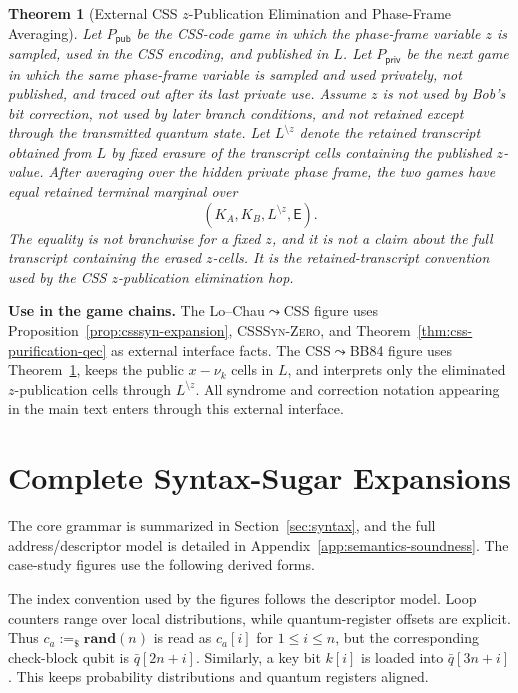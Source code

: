 \documentclass[conference,compsoc]{IEEEtran}
\newcommand{\bb}{\textsf{BB84}\xspace}
\newtheorem{theorem}{Theorem}
\begin{document}
\begin{theorem}[External CSS \(z\)-Publication Elimination and Phase-Frame Averaging]
\label{thm:phase-frame-averaging}
Let \(P_{\mathsf{pub}}\) be the CSS-code game in which the phase-frame variable
\(z\) is sampled, used in the CSS encoding, and published in \(L\). Let
\(P_{\mathsf{priv}}\) be the next game in which the same phase-frame variable is
sampled and used privately, not published, and traced out after its last private
use. Assume \(z\) is not used by Bob's bit correction, not used by later branch
conditions, and not retained except through the transmitted quantum state. Let
\(L^{\setminus z}\) denote the retained transcript obtained from \(L\) by fixed
erasure of the transcript cells containing the published \(z\)-value. After
averaging over the hidden private phase frame, the two games have equal retained
terminal marginal over
\[
(K_A,K_B,L^{\setminus z},\mathsf E).
\]
The equality is not branchwise for a fixed \(z\), and it is not a claim about
the full transcript containing the erased \(z\)-cells. It is the
retained-transcript convention used by the CSS \(z\)-publication elimination
hop.
\end{theorem}

\noindent\textbf{Use in the game chains.}
The Lo--Chau\(\leadsto\)CSS figure uses Proposition~\ref{prop:csssyn-expansion},
\textsc{CSSSyn-Zero}, and Theorem~\ref{thm:css-purification-qec} as external
interface facts. The
CSS\(\leadsto\)\bb figure uses Theorem~\ref{thm:phase-frame-averaging}, keeps
the public \(x-\nu_k\) cells in \(L\), and interprets only the eliminated
\(z\)-publication cells through \(L^{\setminus z}\). All syndrome and correction
notation appearing in the main text enters through this external interface.
\endgroup

\section{Complete Syntax-Sugar Expansions}
\label{app:syntax-sugar}
\begingroup
\setlength{\abovedisplayskip}{2pt}
\setlength{\belowdisplayskip}{2pt}
\setlength{\abovedisplayshortskip}{1pt}
\setlength{\belowdisplayshortskip}{1pt}
\setlength{\jot}{1pt}
\setlength{\arraycolsep}{2pt}
\allowdisplaybreaks

The core grammar is summarized in Section~\ref{sec:syntax}, and the full
address/descriptor model is detailed in Appendix~\ref{app:semantics-soundness}.
The case-study figures use the following derived forms.

The index convention used by the figures follows the descriptor model. Loop
counters range over local distributions, while quantum-register offsets are
explicit. Thus \(c_a:=_\$\mathbf{rand}(n)\) is read as \(c_a[i]\) for
\(1\le i\le n\), but the corresponding check-block qubit is
\(\bar q[2n+i]\). Similarly, a key bit \(k[i]\) is loaded into
\(\bar q[3n+i]\). This keeps probability distributions and quantum registers
aligned.
\end{document}
